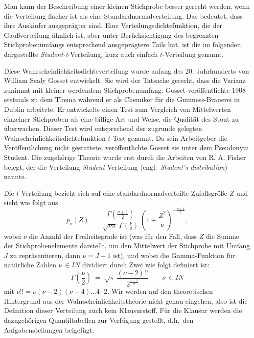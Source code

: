 
Man kann der Beschreibung einer kleinen Stichprobe besser gerecht werden, wenn die
Verteilung flacher ist als eine Standardnormalverteilung. Das bedeutet, dass ihre Ausläufer
ausgeprägter sind. 
Eine Verteilungsdichtefunktion, die der Gaußverteilung ähnlich ist, aber unter
Berücksichtigung des begrenzten Stichprobenumfangs entsprechend ausgeprägtere Tails hat,
ist die im folgenden dargestellte \textsl{Student-t}-Verteilung, kurz auch
einfach $t$-Verteilung genannt.


Diese Wahrscheinlichkeitsdichteverteilung wurde anfang des 20. Jahrhunderts von
William Sealy Gosset entwickelt. Sie wird der
Tatsache gerecht, dass die Varianz zunimmt mit kleiner werdendem Stichprobenumfang.
Gosset veröffentlichte 1908 erstmals zu dem Thema während er als Chemiker für die Guinness-Brauerei
in Dublin arbeitete. Er entwickelte einen Test zum Vergleich von Mittelwerten
einzelner Stichproben als eine billige Art und Weise, die Qualität des Stout
zu überwachen. Dieser Test wird entsprechend der zugrunde gelegten Wahrscheinlichkeitsdichtefunktion
$t$-Test genannt.
Da sein Arbeitgeber die Veröffentlichung nicht gestattete, veröffentlichte Gosset sie unter
dem Pseudonym Student. Die zugehörige Theorie wurde erst durch die
Arbeiten von R. A. Fisher belegt, der die Verteilung \textsl{Student}-Verteilung (engl.\
\textsl{Student's distribution}) nannte.

Die $t$-Verteilung bezieht sich auf eine standardnormalverteilte Zufallsgröße $Z$ und sieht wie folgt aus
\begin{equation}
p_{\nu}(Z) \; = \; 
{\frac {\Gamma \left({\frac {\nu+1}{2}}\right)}{{\sqrt {\nu \pi }} \;
\Gamma \left({\frac {\nu}{2}}\right)}} \, \left(1+{\frac {Z^2}{\nu}}\right)^{-{\frac {\nu+1}{2}}} ,
\end{equation}
wobei $\nu$ die Anzahl der Freiheitsgrade ist (was für den Fall, dass $Z$
die Summe der Stichprobenelemente darstellt, um den Mittelwert der Stichprobe mit Umfang $J$ 
zu repräsentieren, dann $\nu = J-1$ ist), und wobei
die Gamma-Funktion für natürliche Zahlen $\nu \, \in I \!\! N$ dividiert durch Zwei
wie folgt definiert ist:
\begin{equation}
\Gamma \left({\frac{\nu}{2}}\right) \; = \;
\sqrt{\pi} \, \frac{(\nu-2)!!}{ 2^{\frac{\nu-1}{2}} } \qquad \nu \, \in I \!\! N
\label{GammaHalfInt}
\end{equation}
mit $\nu!! = \nu (\nu-2) (\nu-4) \dots 4 \cdot 2$.
Wir werden auf den theoretischen Hintergrund aus der Wahrscheinlichkeitstheorie nicht
genau eingehen, also ist die Definition dieser Verteilung auch kein Klausurstoff.
Für die Klausur werden die dazugehörigen Quantiltabellen zur Verfügung gestellt, d.h.\
den Aufgabenstellungen beigefügt.

